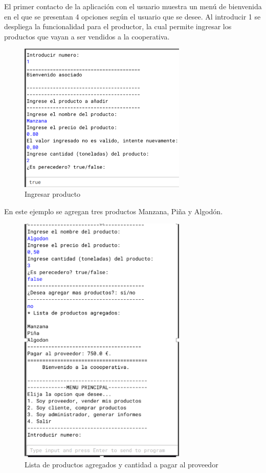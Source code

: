\documentclass[10pt,a4paper]{article}
\begin{document}
El primer contacto de la aplicación con el usuario muestra un menú de bienvenida en el que se presentan 4 opciones según el usuario que se desee. Al introducir 1 se despliega la funcionalidad para el productor, la cual permite ingresar los productos que vayan a ser vendidos a la cooperativa.

\begin{figure}[H]
  \centerline{
  \includegraphics[width=8cm]{Opcion1MenuPrincipal.png}
  }
  \captionsetup{justification=centering}
  \caption{Ingresar producto \label{fig:opcion1MP} }
\end{figure}

En este ejemplo se agregan tres productos Manzana, Piña y Algodón.

\begin{figure}[H]
  \centerline{
  \includegraphics[width=8cm]{IngresoProducto.png}
  }
  \captionsetup{justification=centering}
  \caption{Lista de productos agregados y cantidad a pagar al proveedor \label{fig:opcionMP} }
\end{figure}
\end{document}
